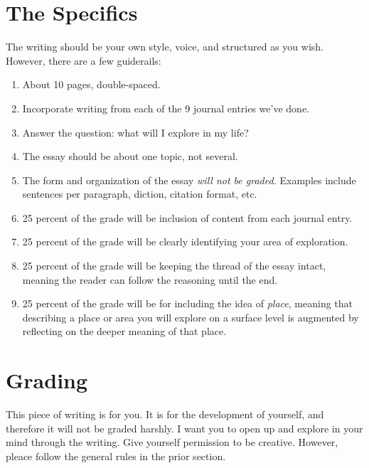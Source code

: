 \documentclass[10pt]{article}
\begin{document}
\section{The Specifics}
The writing should be your own style, voice, and structured as you wish.  However, there are a few guiderails:
\begin{enumerate}
\item About 10 pages, double-spaced.
\item Incorporate writing from each of the 9 journal entries we've done.
\item Answer the question: what will I explore in my life?
\item The essay should be about one topic, not several.
\item The form and organization of the essay \textit{will not be graded.}  Examples include sentences per paragraph, diction, citation format, etc.
\item 25 percent of the grade will be inclusion of content from each journal entry.
\item 25 percent of the grade will be clearly identifying your area of exploration.
\item 25 percent of the grade will be keeping the thread of the essay intact, meaning the reader can follow the reasoning until the end.
\item 25 percent of the grade will be for including the idea of \textit{place}, meaning that describing a place or area you will explore on a surface level is augmented by reflecting on the deeper meaning of that place.
\end{enumerate}

\section{Grading}
This piece of writing is for you.  It is for the development of yourself, and therefore it will not be graded harshly.  I want you to open up and explore in your mind through the writing.  Give yourself permission to be creative.  However, pleace follow the general rules in the prior section.
\end{document}
